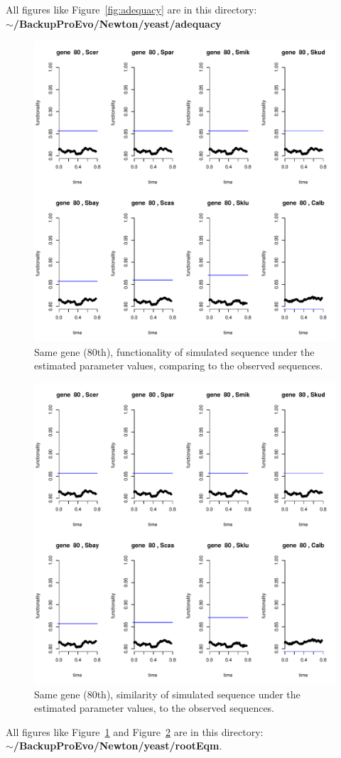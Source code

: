 \documentclass[12pt]{article}
\begin{document}
All figures like Figure~\ref{fig:adequacy} are in this directory: \\ {\bf $\sim$/BackupProEvo/Newton/yeast/adequacy}
\begin{figure}[h]
\centering
\includegraphics[page=2,width=\textwidth]{gene80_sim.pdf}
\caption{Same gene (80th), functionality of simulated sequence under the estimated parameter values, comparing to the observed sequences.}
\label{fig:sim-func}
\end{figure}

\begin{figure}[h]
\centering
\includegraphics[page=3,width=\textwidth]{gene80_sim.pdf}
\caption{Same gene (80th), similarity of simulated sequence under the estimated parameter values, to the observed sequences.}
\label{fig:sim-similarity}
\end{figure}

All figures like Figure~\ref{fig:sim-func} and Figure~\ref{fig:sim-similarity} are in this directory: \\ {\bf $\sim$/BackupProEvo/Newton/yeast/rootEqm}.
\end{document}
